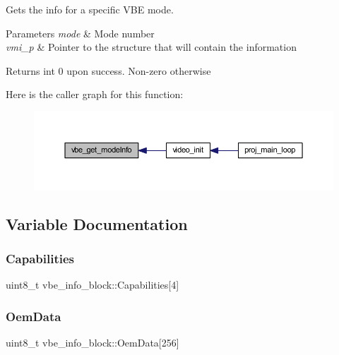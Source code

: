 Gets the info for a specific V\+BE mode. 


\begin{DoxyParams}{Parameters}
{\em mode} & Mode number \\
\hline
{\em vmi\+\_\+p} & Pointer to the structure that will contain the information \\
\hline
\end{DoxyParams}
\begin{DoxyReturn}{Returns}
int 0 upon success. Non-\/zero otherwise 
\end{DoxyReturn}
Here is the caller graph for this function\+:\nopagebreak
\begin{figure}[H]
\begin{center}
\leavevmode
\includegraphics[width=350pt]{group__vbe_ga9e78fdbbaab721c0b5075380a0688cff_icgraph}
\end{center}
\end{figure}


\subsection{Variable Documentation}
\mbox{\label{group__vbe_ga8b92a8e70de3ebac61f917778f3adca0}} 
\subsubsection{\texorpdfstring{Capabilities}{Capabilities}}
{\footnotesize\ttfamily uint8\+\_\+t vbe\+\_\+info\+\_\+block\+::\+Capabilities\mbox{[}4\mbox{]}}

\mbox{\label{group__vbe_gabac031f88530417c8ccd8247159490dc}} 
\subsubsection{\texorpdfstring{Oem\+Data}{OemData}}
{\footnotesize\ttfamily uint8\+\_\+t vbe\+\_\+info\+\_\+block\+::\+Oem\+Data\mbox{[}256\mbox{]}}

